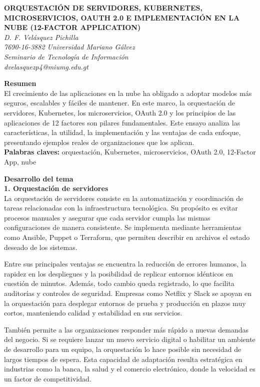 \documentclass[12pt,letterpaper]{article}
\begin{document}
\begin{center}
\textbf{\uppercase{Orquestación de servidores, Kubernetes, Microservicios, OAuth 2.0 e Implementación en la nube (12-Factor Application)}}\\[10pt]
\textit{D. F. Velásquez Pichilla}\\
\textit{7690-16-3882 Universidad Mariano Gálvez}\\
\textit{Seminario de Tecnología de Información}\\
\textit{dvelasquezp4@miumg.edu.gt}
\end{center}

\textbf{Resumen}\\
El crecimiento de las aplicaciones en la nube ha obligado a adoptar modelos más seguros, escalables y fáciles de mantener. En este marco, la orquestación de servidores, Kubernetes, los microservicios, OAuth 2.0 y los principios de las aplicaciones de 12 factores son pilares fundamentales. Este ensayo analiza las características, la utilidad, la implementación y las ventajas de cada enfoque, presentando ejemplos reales de organizaciones que los aplican.\\[8pt]

\textbf{Palabras claves:} orquestación, Kubernetes, microservicios, OAuth 2.0, 12-Factor App, nube

\textbf{Desarrollo del tema}\\

\textbf{1. Orquestación de servidores}\\
La orquestación de servidores consiste en la automatización y coordinación de tareas relacionadas con la infraestructura tecnológica. Su propósito es evitar procesos manuales y asegurar que cada servidor cumpla las mismas configuraciones de manera consistente. Se implementa mediante herramientas como Ansible, Puppet o Terraform, que permiten describir en archivos el estado deseado de los sistemas.  

Entre sus principales ventajas se encuentra la reducción de errores humanos, la rapidez en los despliegues y la posibilidad de replicar entornos idénticos en cuestión de minutos. Además, todo cambio queda registrado, lo que facilita auditorías y controles de seguridad. Empresas como Netflix y Slack se apoyan en la orquestación para desplegar entornos de prueba y producción en plazos muy cortos, manteniendo calidad y estabilidad en sus servicios.  

También permite a las organizaciones responder más rápido a nuevas demandas del negocio. Si se requiere lanzar un nuevo servicio digital o habilitar un ambiente de desarrollo para un equipo, la orquestación lo hace posible sin necesidad de largos tiempos de espera. Esta capacidad de adaptación resulta estratégica en industrias como la banca, la salud y el comercio electrónico, donde la velocidad es un factor de competitividad.
\end{document}

